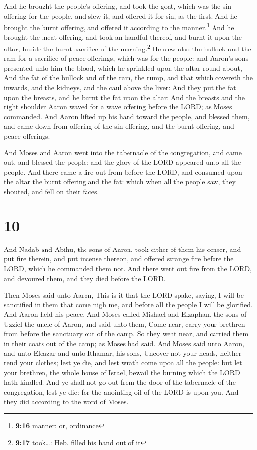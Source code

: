  And he brought the people's offering, and took the goat,
which was the sin offering for the people, and slew it, and offered it
for sin, as the first.  And he brought the burnt
offering, and offered it according to the manner.\footnote{\textbf{9:16}
  manner: or, ordinance}  And he brought the meat
offering, and took an handful thereof, and burnt it upon the altar,
beside the burnt sacrifice of the morning.\footnote{\textbf{9:17}
  took\ldots: Heb. filled his hand out of it}  He slew
also the bullock and the ram for a sacrifice of peace offerings, which
was for the people: and Aaron's sons presented unto him the blood, which
he sprinkled upon the altar round about,  And the fat of
the bullock and of the ram, the rump, and that which covereth the
inwards, and the kidneys, and the caul above the liver: 
And they put the fat upon the breasts, and he burnt the fat upon the
altar:  And the breasts and the right shoulder Aaron
waved for a wave offering before the LORD; as Moses commanded.
 And Aaron lifted up his hand toward the people, and
blessed them, and came down from offering of the sin offering, and the
burnt offering, and peace offerings.

 And Moses and Aaron went into the tabernacle of the
congregation, and came out, and blessed the people: and the glory of the
LORD appeared unto all the people.  And there came a fire
out from before the LORD, and consumed upon the altar the burnt offering
and the fat: which when all the people saw, they shouted, and fell on
their faces.

\hypertarget{section-9}{%
\section{10}\label{section-9}}

 And Nadab and Abihu, the sons of Aaron, took either of
them his censer, and put fire therein, and put incense thereon, and
offered strange fire before the LORD, which he commanded them not.
 And there went out fire from the LORD, and devoured them,
and they died before the LORD.

 Then Moses said unto Aaron, This is it that the LORD
spake, saying, I will be sanctified in them that come nigh me, and
before all the people I will be glorified. And Aaron held his peace.
 And Moses called Mishael and Elzaphan, the sons of Uzziel
the uncle of Aaron, and said unto them, Come near, carry your brethren
from before the sanctuary out of the camp.  So they went
near, and carried them in their coats out of the camp; as Moses had
said.  And Moses said unto Aaron, and unto Eleazar and
unto Ithamar, his sons, Uncover not your heads, neither rend your
clothes; lest ye die, and lest wrath come upon all the people: but let
your brethren, the whole house of Israel, bewail the burning which the
LORD hath kindled.  And ye shall not go out from the door
of the tabernacle of the congregation, lest ye die: for the anointing
oil of the LORD is upon you. And they did according to the word of
Moses.


